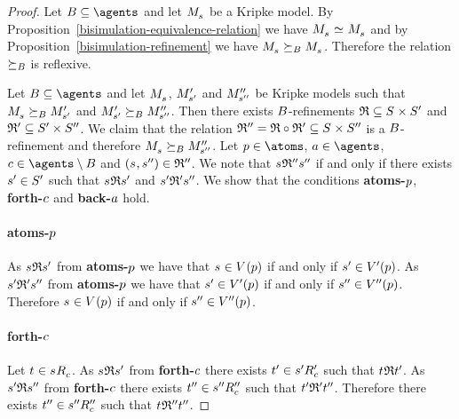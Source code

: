 \begin{proof}
    Let $\agentsB \subseteq \agents$ and let $\kPModel{\kStateS}$ be a Kripke model.
    By Proposition~\ref{bisimulation-equivalence-relation} we have $\kPModel{\kStateS} \bisimilar \kPModel{\kStateS}$ and by Proposition~\ref{bisimulation-refinement} we have $\kPModel{\kStateS} \simulatesBs \kPModel{\kStateS}$.
    Therefore the relation $\succeq_{B}$ is reflexive.

    Let $\agentsB \subseteq \agents$ and let $\kPModel{\kStateS}$, ${M^{\prime}_{{{s}^{\prime}}}}$ and ${M^{\prime\prime}_{{{s}^{\prime\prime}}}}$ be Kripke models such that $\kPModel{\kStateS} \simulatesBs \kPModelP{\kStateSP}$ and ${M^{\prime}_{{{s}^{\prime}}}} \succeq_{B} {M^{\prime\prime}_{{{s}^{\prime\prime}}}}$.
    Then there exists $B$-refinements $\refinement \subseteq \kStates \times \kStatesP$ and $\mathfrak{R}' \subseteq {S^{\prime}} \times {S^{\prime\prime}}$.
    We claim that the relation $\refinement'' = \refinement \circ \refinement' \subseteq \kStates \times \kStatesPP$ is a $B$-refinement and therefore $\kPModel{\kStateS} \simulatesBs \kPModelPP{\kStateSPP}$.
    Let $\atomP \in \atoms$, $\agentA \in \agents$, $\agentC \in \agents \setminus \agentsB$ and $(\kStateS, \kStateSPP) \in \refinement''$.
    We note that $\kStateS \refinement'' \kStateSPP$ if and only if there exists ${{s}^{\prime}} \in {S^{\prime}}$ such that $\kStateS \refinement \kStateSP$ and ${{s}^{\prime}} \mathfrak{R}' {{s}^{\prime\prime}}$.
    We show that the conditions {\bf atoms-$p$}, {\bf forth-$c$} and {\bf back-$a$} hold.

    \paragraph{atoms-$p$}
    As $\kStateS \refinement \kStateSP$ from {\bf atoms-$p$} we have that $\kStateS \in \kValuation(\atomP)$ if and only if ${{s}^{\prime}} \in {V^{\prime}}(p)$.
    As ${{s}^{\prime}} \mathfrak{R}' {{s}^{\prime\prime}}$ from {\bf atoms-$p$} we have that ${{s}^{\prime}} \in {V^{\prime}}(p)$ if and only if ${{s}^{\prime\prime}} \in {V^{\prime\prime}}(p)$.
    Therefore $\kStateS \in \kValuation(\atomP)$ if and only if ${{s}^{\prime\prime}} \in {V^{\prime\prime}}(p)$.

    \paragraph{forth-$c$}
    Let $\kStateT \in \kSuccessorsC{\kStateS}$.
    As $\kStateS \refinement \kStateSP$ from {\bf forth-$c$} there exists ${{t}^{\prime}} \in {{{s}^{\prime}}} {R^{\prime}_{c}}$ such that $\kStateT \refinement \kStateTP$.
    As ${{s}^{\prime}} \mathfrak{R} {{s}^{\prime\prime}}$ from {\bf forth-$c$} there exists ${{t}^{\prime\prime}} \in {{{s}^{\prime\prime}}} {R^{\prime\prime}_{c}}$ such that ${{t}^{\prime}} \mathfrak{R}' {{t}^{\prime\prime}}$.
    Therefore there exists ${{t}^{\prime\prime}} \in {{{s}^{\prime\prime}}} {R^{\prime\prime}_{c}}$ such that $\kStateT \refinement'' \kStateTPP$.


\end{proof}
